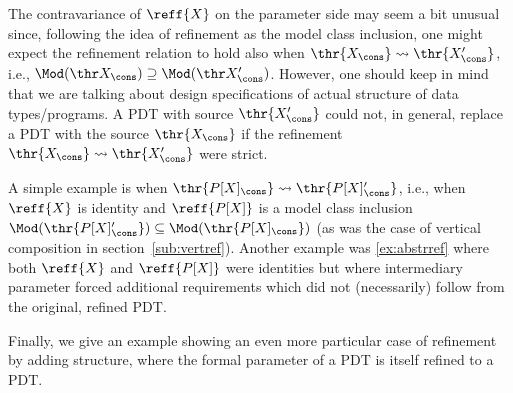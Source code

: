 The contravariance of $\reff{X}$ on the parameter side may seem a bit unusual since,
following the idea of refinement as the model class inclusion, one might
expect the refinement relation to hold also when
$\thr{X_\cons}\leadsto\thr{X'_\cons}$, i.e., $\Mod(\thr
X_\cons)\supseteq\Mod(\thr X'_\cons)$. However, one should keep in mind that
we are talking about design specifications of actual structure of data
types/programs. A PDT with source $\thr{X'_\cons}$ could not, in general,
replace a PDT with the source $\thr{X_\cons}$ if the refinement
$\thr{X_\cons}\leadsto\thr{X'_\cons}$ were strict.

A simple example is when $\thr{P[X]_\cons}\leadsto\thr{P[X]'_\cons}$, i.e., when
$\reff{X}$ is identity and
$\reff{P[X]}$ is a model class inclusion $\Mod(\thr{P[X]'_\cons})\subseteq
\Mod(\thr{P[X]_\cons})$ (as was the case of vertical composition in section~\ref{sub:vertref}). 
Another example was \ref{ex:abstrref} %
where both $\reff{X}$ and $\reff{P[X]}$ were
identities but where intermediary parameter forced additional requirements
which did not (necessarily) follow from the original, refined PDT.

Finally, we give an example showing an even more particular case of
refinement by adding structure, where the formal parameter of a PDT is itself
refined to a PDT.

